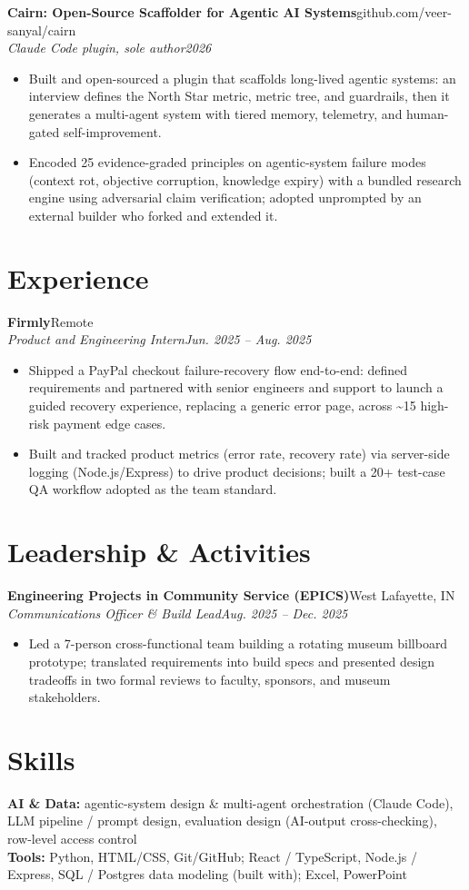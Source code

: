 \documentclass[10pt,letterpaper]{article}
\newcommand{\entry}[4]{%
  \textbf{#1}\hfill #2\\[1pt]
  \textit{#3}\hfill \textit{#4}\\[2pt]
}
\begin{document}
\entry{Cairn: Open-Source Scaffolder for Agentic AI Systems}{github.com/veer-sanyal/cairn}{Claude Code plugin, sole author}{2026}
\begin{itemize}
  \item Built and open-sourced a plugin that scaffolds long-lived agentic systems: an interview defines the North Star metric, metric tree, and guardrails, then it generates a multi-agent system with tiered memory, telemetry, and human-gated self-improvement.
  \item Encoded 25 evidence-graded principles on agentic-system failure modes (context rot, objective corruption, knowledge expiry) with a bundled research engine using adversarial claim verification; adopted unprompted by an external builder who forked and extended it.
\end{itemize}

\section*{Experience}
\entry{Firmly}{Remote}{Product and Engineering Intern}{Jun. 2025 -- Aug. 2025}
\begin{itemize}
  \item Shipped a PayPal checkout failure-recovery flow end-to-end: defined requirements and partnered with senior engineers and support to launch a guided recovery experience, replacing a generic error page, across \textasciitilde15 high-risk payment edge cases.
  \item Built and tracked product metrics (error rate, recovery rate) via server-side logging (Node.js/Express) to drive product decisions; built a 20+ test-case QA workflow adopted as the team standard.
\end{itemize}

\section*{Leadership \& Activities}
\entry{Engineering Projects in Community Service (EPICS)}{West Lafayette, IN}{Communications Officer \& Build Lead}{Aug. 2025 -- Dec. 2025}
\begin{itemize}
  \item Led a 7-person cross-functional team building a rotating museum billboard prototype; translated requirements into build specs and presented design tradeoffs in two formal reviews to faculty, sponsors, and museum stakeholders.
\end{itemize}

\section*{Skills}
\textbf{AI \& Data:} agentic-system design \& multi-agent orchestration (Claude Code), LLM pipeline / prompt design, evaluation design (AI-output cross-checking), row-level access control\\[2pt]
\textbf{Tools:} Python, HTML/CSS, Git/GitHub; React / TypeScript, Node.js / Express, SQL / Postgres data modeling (built with); Excel, PowerPoint
\end{document}
